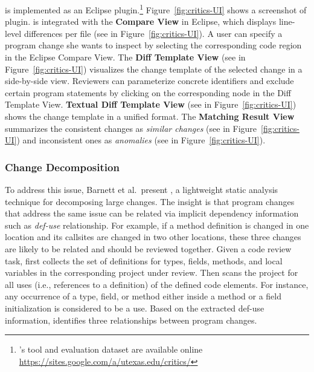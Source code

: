 \documentclass[runningheads,a4paper]{llncs}
\begin{document}
{\critics} is implemented as an Eclipse plugin.\footnote{{\critics}'s tool and evaluation dataset are available online \url{https://sites.google.com/a/utexas.edu/critics/}} Figure~\ref{fig:critics-UI} shows a screenshot of {\critics} plugin. {\critics} is integrated with the {\bf Compare View} in Eclipse, which displays line-level differences per file (see  in Figure~\ref{fig:critics-UI}). A user can specify a program change she wants to inspect by selecting the corresponding code region in the Eclipse Compare View. The {\bf Diff Template View} (see  in Figure~\ref{fig:critics-UI}) visualizes the change template of the selected change in a side-by-side view. Reviewers can parameterize concrete identifiers and exclude certain program statements by clicking on the corresponding node in the Diff Template View. {\bf Textual Diff Template View} (see  in Figure~\ref{fig:critics-UI}) shows the change template in a unified format. The {\bf Matching Result View} summarizes the consistent changes as {\em similar changes} (see  in Figure~\ref{fig:critics-UI}) and inconsistent ones as {\em anomalies} (see  in Figure~\ref{fig:critics-UI}).



\subsubsection{Change Decomposition}

To address this issue, Barnett et al.~present {\clusterchanges}, a lightweight static analysis technique for decomposing large changes. The insight is that program changes that address the same issue can be related via implicit dependency information such as {\em def-use} relationship. For example, if a method definition is changed in one location and its callsites are changed in two other locations, these three changes are likely to be related and should be reviewed together. Given a code review task, {\clusterchanges} first collects the set of definitions for types, fields, methods, and local variables in the corresponding project under review. Then {\clusterchanges} scans the project for all uses (i.e., references to a definition) of the defined code elements. For instance, any occurrence of a type, field, or method either inside a method or a field initialization is considered to be a use. Based on the extracted def-use information, {\clusterchanges} identifies three relationships between program changes. 
\end{document}
